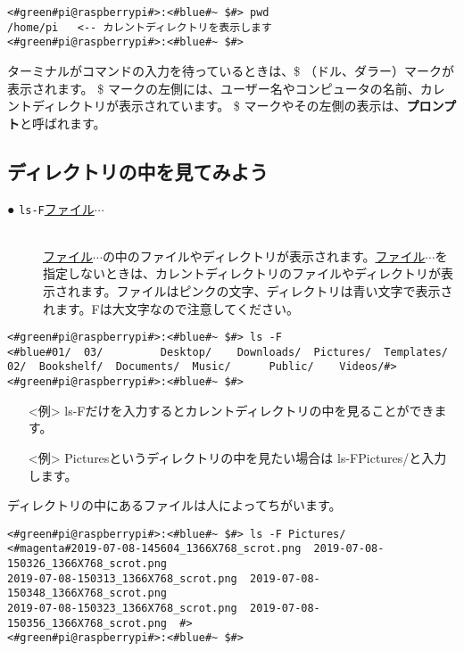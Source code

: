 \begin{lstlisting}[caption=pwdコマンドの例,label=pwdtest]
<#green#pi@raspberrypi#>:<#blue#~ $#> pwd
/home/pi   <-- カレントディレクトリを表示します
<#green#pi@raspberrypi#>:<#blue#~ $#>
\end{lstlisting}

ターミナルがコマンドの入力を待っているときは、\$ （ドル、ダラー）マークが表示されます。
\$ マークの左側には、ユーザー名やコンピュータの名前、カレントディレクトリが表示されています。
\$ マークやその左側の表示は、{\bf プロンプト}と呼ばれます。

\subsection{ディレクトリの中を見てみよう}
\begin{description}
\item[● \texttt{ls}\textvisiblespace \texttt{-F}\textvisiblespace \underline{ファイル}$\cdots$]\mbox{}\\
\underline{ファイル}$\cdots$の中のファイルやディレクトリが表示されます。\underline{ファイル}$\cdots$を指定しないときは、カレントディレクトリのファイルやディレクトリが表示されます。ファイルはピンクの文字、ディレクトリは青い文字で表示されます。Fは大文字なので注意してください。
\end{description}

\begin{minipage}{\linewidth}
\begin{lstlisting}[caption=ls -F コマンドの例。ファイルやディレクトリが表示されます,label=lsFtest]
<#green#pi@raspberrypi#>:<#blue#~ $#> ls -F
<#blue#01/  03/         Desktop/    Downloads/  Pictures/  Templates/
02/  Bookshelf/  Documents/  Music/      Public/    Videos/#>
<#green#pi@raspberrypi#>:<#blue#~ $#>
\end{lstlisting}
\end{minipage}

\begin{itemize}
\item[<例>] ls\textvisiblespace -Fだけを入力するとカレントディレクトリの中を見ることができます。 
\item[<例>] Picturesというディレクトリの中を見たい場合は ls\textvisiblespace -F\textvisiblespace Pictures/と入力します。 
\end{itemize}

ディレクトリの中にあるファイルは人によってちがいます。
\begin{lstlisting}[caption=ls -F Pictures/コマンドの例,label=lsFPicttest]
<#green#pi@raspberrypi#>:<#blue#~ $#> ls -F Pictures/
<#magenta#2019-07-08-145604_1366X768_scrot.png  2019-07-08-150326_1366X768_scrot.png  
2019-07-08-150313_1366X768_scrot.png  2019-07-08-150348_1366X768_scrot.png  
2019-07-08-150323_1366X768_scrot.png  2019-07-08-150356_1366X768_scrot.png  #>
<#green#pi@raspberrypi#>:<#blue#~ $#> 
\end{lstlisting}


